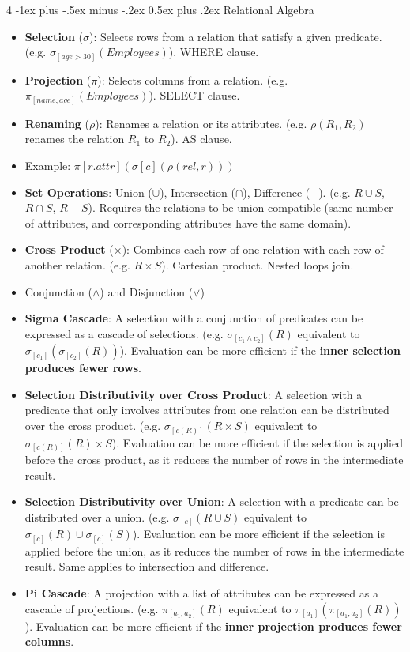 \documentclass[10pt, landscape]{article}
\makeatletter
\renewcommand{\section}{\@startsection{section}{1}{0mm}%
  {-1ex plus -.5ex minus -.2ex}%
  {0.5ex plus .2ex}%
{\normalfont\large\bfseries}}
\makeatother
\begin{document}
\begin{multicols*}{4}
  \section{Relational Algebra}
  \begin{itemize}
    \item \textbf{Selection} ($\sigma$): Selects rows from a relation that satisfy a given predicate. (e.g. $\sigma_{[age > 30]}(Employees)$). WHERE clause.
    \item \textbf{Projection} ($\pi$): Selects columns from a relation. (e.g. $\pi_{[name, age]}(Employees)$). SELECT clause.
    \item \textbf{Renaming} ($\rho$): Renames a relation or its attributes. (e.g. $\rho(R_1, R_2)$ renames the relation $R_1$ to $R_2$). AS clause.
    \item Example: $\pi[r.attr](\sigma[c](\rho(rel,r)))$
    \item \textbf{Set Operations}: Union ($\cup$), Intersection ($\cap$), Difference ($-$). (e.g. $R \cup S$, $R \cap S$, $R - S$). Requires the relations to be union-compatible (same number of attributes, and corresponding attributes have the same domain).
    \item \textbf{Cross Product} ($\times$): Combines each row of one relation with each row of another relation. (e.g. $R \times S$). Cartesian product. Nested loops join.
    \item Conjunction ($\land$) and Disjunction ($\lor$)
    \item \textbf{Sigma Cascade}: A selection with a conjunction of predicates can be expressed as a cascade of selections. (e.g. $\sigma_{[c_1 \land c_2]}(R)$ equivalent to $\sigma_{[c_1]}(\sigma_{[c_2]}(R))$). Evaluation can be more efficient if the \textbf{inner selection produces fewer rows}.
    \item \textbf{Selection Distributivity over Cross Product}: A selection with a predicate that only involves attributes from one relation can be distributed over the cross product. (e.g. $\sigma_{[c(R)]}(R \times S)$ equivalent to $\sigma_{[c(R)]}(R) \times S$). Evaluation can be more efficient if the selection is applied before the cross product, as it reduces the number of rows in the intermediate result.
    \item \textbf{Selection Distributivity over Union}: A selection with a predicate can be distributed over a union. (e.g. $\sigma_{[c]}(R \cup S)$ equivalent to $\sigma_{[c]}(R) \cup \sigma_{[c]}(S)$). Evaluation can be more efficient if the selection is applied before the union, as it reduces the number of rows in the intermediate result. Same applies to intersection and difference.
    \item \textbf{Pi Cascade}: A projection with a list of attributes can be expressed as a cascade of projections. (e.g. $\pi_{[a_1, a_2]}(R)$ equivalent to $\pi_{[a_1]}(\pi_{[a_1, a_2]}(R))$). Evaluation can be more efficient if the \textbf{inner projection produces fewer columns}.
  \end{itemize}


\end{multicols*}
\end{document}
